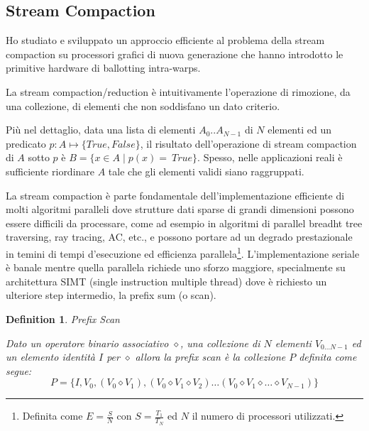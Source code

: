 \documentclass[a4paper]{article}
\newtheorem{mydef}{Definition}
\begin{document}
 
  	
  	\subsection{Stream Compaction}
  	Ho studiato e sviluppato  un approccio efficiente al problema della stream compaction su processori
  	grafici di nuova generazione che hanno introdotto le primitive hardware di
  	ballotting intra-warps.
  	
  	La stream compaction/reduction è intuitivamente l'operazione di
  	rimozione, da una collezione, di elementi che non soddisfano un dato
  	criterio.
  	
  	Più nel dettaglio, data una lista di elementi  $A_0..A_{N-1}$ di $N$ elementi
  	ed un predicato $p:A \mapsto \{True,False\}$, il risultato dell'operazione di
  	stream compaction di $A$ sotto $p$ è $B=\{x \in A \;|\; p(x)=\ True\}$. 
  	Spesso, nelle applicazioni reali è sufficiente riordinare $A$ tale che gli
  	elementi validi siano raggruppati. 
  	
  	La stream compaction è parte fondamentale dell'implementazione
  	efficiente di molti algoritmi paralleli dove strutture dati sparse di grandi
  	dimensioni possono essere  difficili da processare, come ad esempio  in
  	algoritmi di parallel breadht tree traversing, ray tracing, AC, etc.,
  	e possono portare ad un degrado prestazionale in temini di tempi
  	d'esecuzione ed efficienza parallela\footnote{Definita come $E=\frac{S}{N}
  	$ con $S=\frac{T_1}{T_N}$ ed $N$ il numero di processori utilizzati.}.
  	L'implementazione seriale è banale mentre quella parallela richiede uno sforzo maggiore, specialmente su
  	architettura SIMT (single instruction multiple thread) dove è richiesto un
  	ulteriore step intermedio, la prefix sum (o scan). 
  	\begin{mydef}{Prefix Scan}
  	
  		Dato un operatore binario associativo  $\diamond$, una collezione di $N$
  		elementi $V_{0 \ldots {N-1}}$ ed un elemento identità $I$ per $\diamond$
  		allora la prefix scan è la collezione $P$ definita come segue:
  		\[
  		P= \{I,V_0,(V_0 \diamond V_1),(V_0 \diamond V_1 \diamond V_2) \ldots
  		(V_0 \diamond V_1 \diamond \ldots \diamond V_{N-1}) \}
  		\]
  		
  	\end{mydef}
  	
\end{document}
